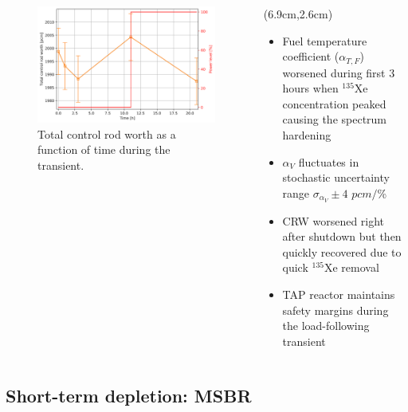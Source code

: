 \begin{frame}
\begin{textblock*}{12.5cm}
\begin{columns}
\begin{figure}[t]
\begin{overprint}
	\includegraphics[width=1.15\linewidth]{../dissertation/figures/ch5/saf_par/crw_evo.png}
	\vspace{-6mm}
	\caption{Total control rod worth as a function of time during the 
	transient.}
			\end{overprint}
		\end{figure}
		
		\column[t]{5.5cm}
		\begin{textblock*}{5.9cm}(6.9cm,2.6cm) %
			\begin{itemize}
				\itemsep=0.8em
				\item<1-> Fuel temperature coefficient ($\alpha_{T,F}$) 
				worsened during first 3 hours when $^{135}$Xe concentration 
				peaked causing the spectrum hardening
				\item<2-> $\alpha_V$ fluctuates in stochastic uncertainty 
				range $\sigma_{\alpha_V}\pm4$ $pcm/$\%
				\item<3-> CRW worsened right after shutdown but then quickly 
				recovered due to quick $^{135}$Xe removal
				\item<4-> TAP reactor maintains safety margins during the 
				load-following transient
			\end{itemize}
				
		\end{textblock*}
	\end{columns}
\end{textblock*}
\end{frame}


\subsection{Short-term depletion: MSBR}

